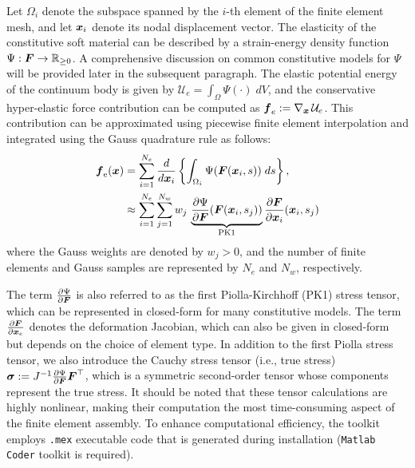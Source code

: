 \begin{intermez}
    
Let $\Omega_i$ denote the subspace spanned by the $i$-th element of the finite element mesh, and let ${\boldsymbol{x}}_i$ denote its nodal displacement vector. The elasticity of the constitutive soft material can be described by a strain-energy density function $\Psi: {\boldsymbol{F}} \to \mathbb{R}_{\ge 0}$. A comprehensive discussion on common constitutive models for $\Psi$ will be provided later in the subsequent paragraph. The elastic potential energy of the continuum body is given by $\mathcal{U}_e = \int_\Omega \Psi(\cdot) \; dV$, and the conservative hyper-elastic force contribution can be computed as ${\boldsymbol{f}}_e := \nabla_{{\boldsymbol{x}}}\,\mathcal{U}_e$. This contribution can be approximated using piecewise finite element interpolation and integrated using the Gauss quadrature rule \cite{Kim2018} as follows:
    \begin{align}
        {\boldsymbol{f}}_\textrm{e}({\boldsymbol{x}}) & = \sum_{i=1}^{N_e} \frac{d}{d{\boldsymbol{x}}_i} \left\{\int_{\Omega_i} \Psi({\boldsymbol{F}}({\boldsymbol{x}}_i,s)) \; ds\right\}, \notag                                                    \\
                           & \approx \sum_{i=1}^{N_e} \sum_{j=1}^{N_w} w_j \, \underbrace{\frac{\partial \Psi}{\partial {\boldsymbol{F}}}({\boldsymbol{F}}({\boldsymbol{x}}_i,s_j)) }_{\textrm{PK1}} \frac{\partial {\boldsymbol{F}}}{\partial {\boldsymbol{x}}_i}({\boldsymbol{x}}_i,s_j)
        \label{eq:C5:fem_hyper}
    \end{align}
where the Gauss weights are denoted by $w_j > 0$, and the number of finite elements and Gauss samples are represented by $N_e$ and $N_w$, respectively.

The term $\frac{\partial \Psi}{\partial {\boldsymbol{F}}}$ is also referred to as the first Piolla-Kirchhoff (PK1) stress tensor, which can be represented in closed-form for many constitutive models. The term $\frac{\partial {\boldsymbol{F}}}{\partial {\boldsymbol{x}}_e}$ denotes the deformation Jacobian, which can also be given in closed-form but depends on the choice of element type. In addition to the first Piolla stress tensor, we also introduce the Cauchy stress tensor (i.e., true stress) $\boldsymbol{\sigma} := J^{-1} \frac{\partial \Psi}{\partial {\boldsymbol{F}}} {\boldsymbol{F}}^\top$, which is a symmetric second-order tensor whose components represent the true stress. It should be noted that these tensor calculations are highly nonlinear, making their computation the most time-consuming aspect of the finite element assembly. To enhance computational efficiency, the toolkit employs \texttt{.mex} executable code that is generated during installation (\texttt{Matlab Coder} toolkit is required).
\end{intermez}


